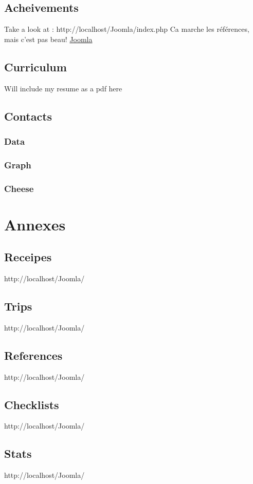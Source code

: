 \documentclass[8pt]{article} %
\begin{document}
\subsection{Acheivements}

Take a look at : http://localhost/Joomla/index.php
Ca marche les références, mais c'est pas beau!
\href{http://localhost/Joomla/index.php}{Joomla}

\subsection{Curriculum}
{\footnotesize
Will include my resume as a pdf here\\
}

\subsection{Contacts}

{\footnotesize
\subsubsection{Data}

\subsubsection{Graph}

\subsubsection{Cheese}

}

\section{Annexes}

\subsection{Receipes}
http://localhost/Joomla/
\subsection{Trips}
http://localhost/Joomla/
\subsection{References}
http://localhost/Joomla/
\subsection{Checklists}			
http://localhost/Joomla/
\subsection{Stats}
http://localhost/Joomla/
\end{document}
